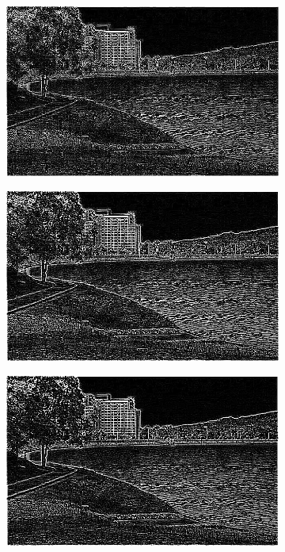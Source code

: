 \begin{figure}[H]
	\centering
	\begin{subfigure}[ht]{0.3\textwidth}
		\centering
		\includegraphics[height=0.7\textwidth]{figures/DoG1.png}
	\end{subfigure}
	\begin{subfigure}[ht]{0.3\textwidth}
		\centering
		\includegraphics[height=0.7\textwidth]{figures/DoG2.png}
	\end{subfigure}
	\begin{subfigure}[ht]{0.3\textwidth}
	\centering
	\includegraphics[height=0.7\textwidth]{figures/DoG3.png}

\end{subfigure}
\end{figure}
